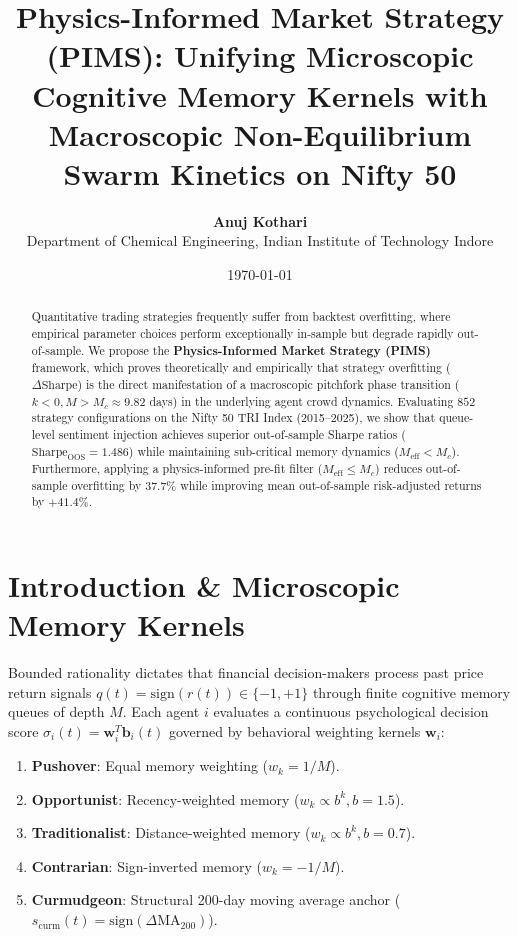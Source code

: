 \documentclass[11pt,a4paper]{article}
\title{\textbf{Physics-Informed Market Strategy (PIMS): Unifying Microscopic Cognitive Memory Kernels with Macroscopic Non-Equilibrium Swarm Kinetics on Nifty 50}}
\author{\textbf{Anuj Kothari} \\ Department of Chemical Engineering, Indian Institute of Technology Indore}
\date{\today}
\begin{document}
\maketitle

\begin{abstract}
Quantitative trading strategies frequently suffer from backtest overfitting, where empirical parameter choices perform exceptionally in-sample but degrade rapidly out-of-sample. We propose the \textbf{Physics-Informed Market Strategy (PIMS)} framework, which proves theoretically and empirically that strategy overfitting ($\Delta \text{Sharpe}$) is the direct manifestation of a macroscopic pitchfork phase transition ($k < 0, M > M_c \approx 9.82$ days) in the underlying agent crowd dynamics. Evaluating $852$ strategy configurations on the Nifty 50 TRI Index (2015--2025), we show that queue-level sentiment injection achieves superior out-of-sample Sharpe ratios ($\text{Sharpe}_{\text{OOS}} = 1.486$) while maintaining sub-critical memory dynamics ($M_{\text{eff}} < M_c$). Furthermore, applying a physics-informed pre-fit filter ($M_{\text{eff}} \le M_c$) reduces out-of-sample overfitting by $37.7\%$ while improving mean out-of-sample risk-adjusted returns by $+41.4\%$.
\end{abstract}

\section{Introduction \& Microscopic Memory Kernels}

Bounded rationality dictates that financial decision-makers process past price return signals $q(t) = \text{sign}(r(t)) \in \{-1, +1\}$ through finite cognitive memory queues of depth $M$. Each agent $i$ evaluates a continuous psychological decision score $\sigma_i(t) = \mathbf{w}_i^T \mathbf{b}_i(t)$ governed by behavioral weighting kernels $\mathbf{w}_i$:
\begin{enumerate}
    \item \textbf{Pushover}: Equal memory weighting ($w_k = 1/M$).
    \item \textbf{Opportunist}: Recency-weighted memory ($w_k \propto b^k, b=1.5$).
    \item \textbf{Traditionalist}: Distance-weighted memory ($w_k \propto b^k, b=0.7$).
    \item \textbf{Contrarian}: Sign-inverted memory ($w_k = -1/M$).
    \item \textbf{Curmudgeon}: Structural 200-day moving average anchor ($s_{\text{curm}}(t) = \text{sign}(\Delta \text{MA}_{200})$).
\end{enumerate}
\end{document}
